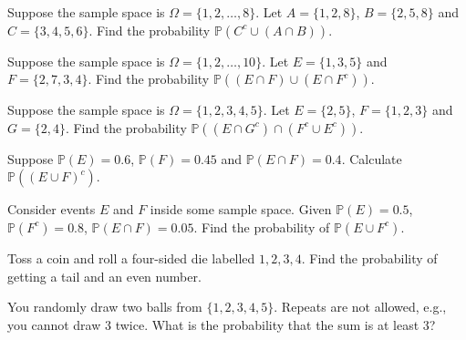 \documentclass[../main.tex]{subfiles}
\begin{document}
\clearpage

\begin{example}
  Suppose the sample space is \(\Omega = \{1,2,\ldots,8\}\). Let \(A = \{1,2,8\}\), \(B = \{2,5,8\}\) and \(C = \{3,4,5,6\}\).  Find the probability \(\mathbb{P}( C^{c} \cup (A \cap B) )\).
  
\end{example}

\begin{example}
  Suppose the sample space is \(\Omega = \{1,2,\ldots,10\}\).  Let \(E = \{1,3,5\}\) and \(F = \{2,7,3,4\}\). Find the probability \(\mathbb{P}( (E \cap F) \cup (E \cap F^{c})) \).
\end{example}

\begin{example}
  Suppose the sample space is \(\Omega = \{1,2,3,4,5\}\).  Let \(E = \{2,5\}\), \(F = \{1,2,3\}\) and \(G = \{2,4\}\). Find the probability \(\mathbb{P}( (E \cap G^{c}) \cap ( F^{c} \cup E^{c} )) \).
\end{example}
\clearpage

\begin{example}
  Suppose \(\mathbb{P}(E) = 0.6\), \(\mathbb{P}(F) = 0.45\) and \(\mathbb{P}(E \cap F) = 0.4\). Calculate \(\mathbb{P}( (E \cup F)^{c})\).
\end{example}

\begin{example}
  Consider events \(E\) and \(F\) inside some sample space. Given \(\mathbb{P}(E) = 0.5\), \(\mathbb{P}(F^{c}) = 0.8\), \(\mathbb{P}(E \cap F) = 0.05\). Find the probability of \(\mathbb{P}(E \cup F^{c})\).
\end{example}

\begin{example}
  Toss a coin and roll a four-sided die labelled \(1,2,3,4\).  Find the probability of getting a tail and an even number.

\end{example}

\begin{example}
  You randomly draw two balls from \(\{1,2,3,4,5\}\).  Repeats are not allowed, e.g., you cannot draw \(3\) twice.  What is the probability that the sum is at least \(3\)?

\end{example}


\clearpage
\end{document}

